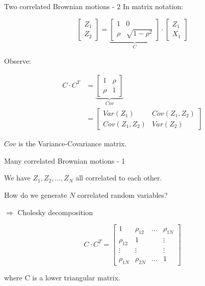 \begin{frame}{Two correlated Brownian motions - 2}
	In matrix notation:
	
	\pause
	\begin{displaymath}
		\begin{bmatrix}
			Z_1 \\
			Z_2
		\end{bmatrix}
		=
		\underbrace{\begin{bmatrix}
			1 & 0 \\
			\rho & \sqrt{1-\rho^2}
		\end{bmatrix}}_{C}
		\cdot
		\begin{bmatrix}
			Z_1 \\
			X_1
		\end{bmatrix}
	\end{displaymath}
	
	\pause
	Observe:
	
	\begin{align*}
		C \cdot C^{T} & = 
		\underbrace{\begin{bmatrix}
			1 & \rho \\
			\rho & 1
		\end{bmatrix}}_{Cov} \\
		& = \begin{bmatrix}
			Var(Z_1) & Cov(Z_1, Z_2) \\
			Cov(Z_1, Z_2) & Var(Z_2)
		\end{bmatrix}
	\end{align*}
	
	\pause
	$Cov$ is the Variance-Covariance matrix.
	
\end{frame}


\begin{frame}{Many correlated Brownian motions - 1}

\pause
We have $Z_1, Z_2, \ldots, Z_N$ all correlated to each other. 

\pause
\bigskip
How do we generate $N$ correlated random variables?

\pause
\bigskip
$\Rightarrow$ Cholesky decomposition

\pause
\begin{displaymath}
	C \cdot C^{T} = 
		\begin{bmatrix}
			1 & \rho_{12} & \ldots & \rho_{1N} \\
			\rho_{12} & 1 & & \vdots \\
			\vdots & \vdots & & \vdots\\
			\rho_{1N} & \rho_{2N} & \dots & 1
		\end{bmatrix}
\end{displaymath}

where C is a lower triangular matrix.

\end{frame}


